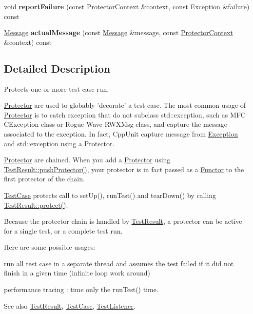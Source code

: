 \begin{DoxyCompactItemize}
\item 
\hypertarget{class_protector_ac52d8e2909a5621d2692ec3ce5d4dbc7}{void {\bfseries report\+Failure} (const \hyperlink{class_protector_context}{Protector\+Context} \&context, const \hyperlink{class_exception}{Exception} \&failure) const }\label{class_protector_ac52d8e2909a5621d2692ec3ce5d4dbc7}

\item 
\hypertarget{class_protector_a259356bbf5f03e07f75ac797c9e34737}{\hyperlink{class_message}{Message} {\bfseries actual\+Message} (const \hyperlink{class_message}{Message} \&message, const \hyperlink{class_protector_context}{Protector\+Context} \&context) const }\label{class_protector_a259356bbf5f03e07f75ac797c9e34737}

\end{DoxyCompactItemize}


\subsection{Detailed Description}
Protects one or more test case run. 

\hyperlink{class_protector}{Protector} are used to globably 'decorate' a test case. The most common usage of \hyperlink{class_protector}{Protector} is to catch exception that do not subclass std\+::exception, such as M\+F\+C C\+Exception class or Rogue Wave R\+W\+X\+Msg class, and capture the message associated to the exception. In fact, Cpp\+Unit capture message from \hyperlink{class_exception}{Exception} and std\+::exception using a \hyperlink{class_protector}{Protector}.

\hyperlink{class_protector}{Protector} are chained. When you add a \hyperlink{class_protector}{Protector} using \hyperlink{class_test_result_a0b188115687eb65588da9c62411498e2}{Test\+Result\+::push\+Protector()}, your protector is in fact passed as a \hyperlink{class_functor}{Functor} to the first protector of the chain.

\hyperlink{class_test_case}{Test\+Case} protects call to set\+Up(), run\+Test() and tear\+Down() by calling \hyperlink{class_test_result_a2c22f3763f6fa7d1f15f3f5fc23e8725}{Test\+Result\+::protect()}.

Because the protector chain is handled by \hyperlink{class_test_result}{Test\+Result}, a protector can be active for a single test, or a complete test run.

Here are some possible usages\+:
\begin{DoxyItemize}
\item run all test case in a separate thread and assumes the test failed if it did not finish in a given time (infinite loop work around)
\item performance tracing \+: time only the run\+Test() time. \begin{DoxySeeAlso}{See also}
\hyperlink{class_test_result}{Test\+Result}, \hyperlink{class_test_case}{Test\+Case}, \hyperlink{class_test_listener}{Test\+Listener}. 
\end{DoxySeeAlso}

\end{DoxyItemize}

